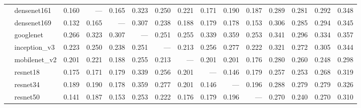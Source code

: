 \begin{table}
\begin{tabular}{llrrrrrrrrrrrrr}
       & densenet161 &                 0.160 &                   --- &                 0.165 &               0.323 &                   0.250 &                   0.221 &              0.171 &              0.190 &              0.187 &               0.289 &               0.281 &               0.292 &               0.348 \\
       & densenet169 &                 0.132 &                 0.165 &                   --- &               0.307 &                   0.238 &                   0.188 &              0.179 &              0.178 &              0.153 &               0.306 &               0.285 &               0.294 &               0.345 \\
       & googlenet &                 0.266 &                 0.323 &                 0.307 &                 --- &                   0.251 &                   0.255 &              0.339 &              0.359 &              0.253 &               0.341 &               0.296 &               0.334 &               0.357 \\
       & inception_v3 &                 0.223 &                 0.250 &                 0.238 &               0.251 &                     --- &                   0.213 &              0.256 &              0.277 &              0.222 &               0.321 &               0.272 &               0.305 &               0.344 \\
       & mobilenet_v2 &                 0.201 &                 0.221 &                 0.188 &               0.255 &                   0.213 &                     --- &              0.201 &              0.201 &              0.176 &               0.280 &               0.260 &               0.248 &               0.298 \\
       & resnet18 &                 0.175 &                 0.171 &                 0.179 &               0.339 &                   0.256 &                   0.201 &                --- &              0.146 &              0.179 &               0.257 &               0.253 &               0.268 &               0.319 \\
       & resnet34 &                 0.189 &                 0.190 &                 0.178 &               0.359 &                   0.277 &                   0.201 &              0.146 &                --- &              0.196 &               0.288 &               0.279 &               0.279 &               0.326 \\
       & resnet50 &                 0.141 &                 0.187 &                 0.153 &               0.253 &                   0.222 &                   0.176 &              0.179 &              0.196 &                --- &               0.270 &               0.240 &               0.270 &               0.310 \\

\end{tabular}
\end{table}

